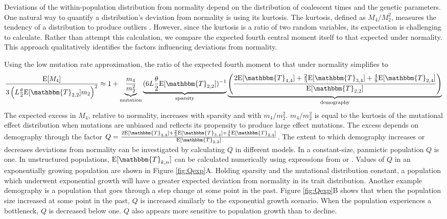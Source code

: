Deviations of the within-population distribution from normality depend on the
distribution of coalescent times and the genetic parameters. One natural way to
quantify a distribution's deviation from normality is using its kurtosis. The
kurtosis, defined as $M_4/M_2^2$, measures the tendency of a distribution to
produce outliers \citep{Westfall2014}. However, since the kurtosis is a ratio of
two random variables, its expectation is challenging to calculate. Rather than
attempt this calculation, we compare the expected fourth central moment itself
to that expected under normality. This approach qualitatively identifies the
factors influencing deviations from normality.

Using the low mutation rate approximation, the ratio of the expected fourth
moment to that under normality simplifies to
\begin{equation}
  \label{eq:popmom4coal}
  \frac{\E[M_4]}{3\left(L \T \E[\mathbbm{T}_{2,2}] m_2\right)^2} \approx 1 +
  \underbrace{\frac{m_4}{m_2^2}}_{\text{mutation}} \underbrace{(6 L \T \E[\mathbbm{T}_{2,2}])^{-1}}_{\text{sparsity}}
      \underbrace{\left( \frac{2\E[\mathbbm{T}_{4,4}] +
      \frac{2}{3}\E[\mathbbm{T}_{3,4}] +
      \frac{4}{9}\E[\mathbbm{T}_{2,4}]}{\E[\mathbbm{T}_{2,2}]}\right)}_{\text{demography}}
\end{equation}
The expected excess in $M_4$, relative to normality, increases with sparsity and
with $m_4/m_2^2$. $m_4/m_2^2$ is equal to the kurtosis of the mutational effect
distribution when mutations are unbiased and reflects its propensity to produce
large effect mutations. The excess depends on demography through the factor $Q
= \frac{2\E[\mathbbm{T}_{4,4}] + \frac{2}{3}\E[\mathbbm{T}_{3,4}]
+ \frac{4}{9}\E[\mathbbm{T}_{2,4}]}{\E[\mathbbm{T}_{2,2}]}$. The extent to which
demography increases or decreases deviations from normality can be investigated
by calculating $Q$ in different models. In a constant-size, panmictic population
$Q$ is one. In unstructured populations, $\E[\mathbbm{T}_{k,n}]$ can be
calculated numerically using expressions from \citet{Griffiths1998}
or \citet{Polanski2003a}. Values of $Q$ in an exponentially growing population
are shown in Figure \ref{fig:Qexp}A. Holding sparsity and the mutational
distribution constant, a population which underwent exponential growth will have
a greater expected deviation from normality in its trait distribution. Another
example demography is a population that goes through a step change at some point
in the past. Figure \ref{fig:Qexp}B shows that when the population size
increased at some point in the past, $Q$ is increased similarly to the
exponential growth scenario. When the population experiences a bottleneck, $Q$
is decreased below one. $Q$ also appears more sensitive to population growth
than to decline.

